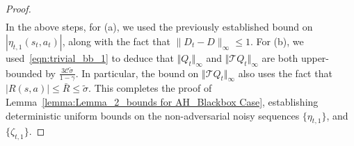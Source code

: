 \documentclass{article}
\newcommand{\mc}{\mathcal}
\begin{document}
\begin{proof}
\begin{equation*}
\begin{aligned}
\end{aligned}
\end{equation*}
In the above steps, for (a), we used the previously established bound on $\left| \eta_{t,1}(s_t,a_t) \right|$, along with the fact that $\|D_t - D\|_\infty \le 1$. For (b), we used~\eqref{eqn:trivial_bb_1} to deduce that $\Vert Q_t \Vert_{\infty}$ and $\Vert \mc{T} Q_t \Vert_{\infty}$ are both upper-bounded by $\frac{3 \mathcal{C} \tilde{\sigma}}{1 - \gamma}.$ In particular, the bound on $\Vert \mc{T} Q_t \Vert_{\infty}$ also uses the fact that $|R(s,a)| \leq \bar{R} \leq \tilde{\sigma}.$ This completes the proof of Lemma~\ref{lemma:Lemma_2_bounds for AH_Blackbox Case}, establishing deterministic uniform bounds on the non-adversarial noisy sequences \(\{\eta_{t,1}\}\), and \(\{\zeta_{t,1}\}\).
\end{proof}
\end{document}
